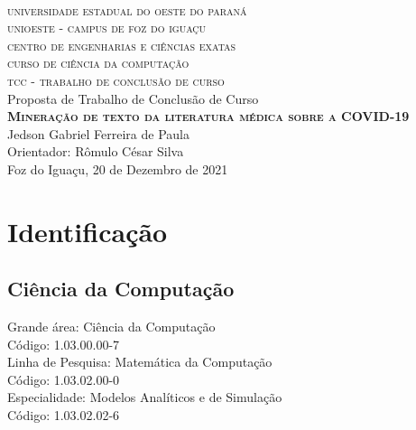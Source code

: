 \documentclass[
	12pt,				%
	a4paper,			%
	english,			%
	brazil,				%
	]{article}
\begin{document}

\begin{center}

	\textsc{
		\large
			\\universidade estadual do oeste do paran\' a
			\\unioeste - campus de foz do igua\c cu
			\\centro de engenharias e ci\^ encias exatas
			\\curso de ci\^ encia da computa\c c\~ ao
			\\[1 cm]tcc - trabalho de conclus\~ ao de curso
	}
	\\
	[4 cm]
	\large Proposta de Trabalho de Conclus\~ ao de Curso
    \\
	\textbf{
	    \textsc{Minera\c c\~ ao de texto da literatura m\' edica sobre a COVID-19}
    }
	\\[5 cm]Jedson Gabriel Ferreira de Paula
    \\Orientador: Rômulo C\' esar Silva
    \\[2 cm]Foz do Igua\c cu, 20 de Dezembro de 2021
    
    
\end{center}

\thispagestyle{empty}

\section{Identifica\c c\~ ao}
    
    \subsection{Ci\^ encia da Computa\c c\~ ao} 
    
    
        \noindent Grande \' area: Ci\^ encia da Computa\c c\~ ao
        \\C\' odigo: 1.03.00.00-7 
    	\\[1 cm]Linha de Pesquisa: Matem\' atica da Computa\c c\~ ao
    	\\C\' odigo: 1.03.02.00-0
    	\\[1 cm]Especialidade: Modelos Anal\' iticos e de Simula{\c c}\~ ao
    	\\C\' odigo: 1.03.02.02-6
    	
\end{document}
